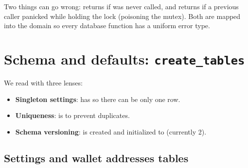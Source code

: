 Two things can go wrong:  returns  if  was never called, and  returns  if a previous caller panicked while holding the lock (poisoning the mutex). Both are mapped into the  domain so every database function has a uniform error type.

\section{Schema and defaults: \texttt{create\_tables}}
\label{sec:create-tables}

We read  with three lenses:

\begin{itemize}
  \item \textbf{Singleton settings}:  has  so there can be only one row.
  \item \textbf{Uniqueness}:  is  to prevent duplicates.
  \item \textbf{Schema versioning}:  is created and initialized to  (currently 2).
\end{itemize}

\subsection{Settings and wallet addresses tables}
\label{sec:tables-part1}


